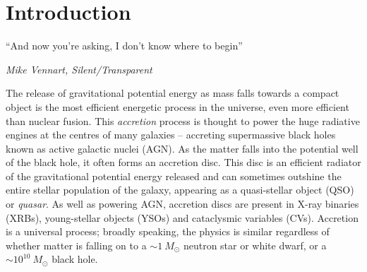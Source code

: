 \chapter{Introduction}

\epigraph{``And now you're asking, I don't know where to begin''}{{\sl Mike Vennart, Silent/Transparent}}
%

The release of gravitational potential energy as mass falls towards
a compact object is the most efficient energetic process in the universe,
even more efficient than nuclear fusion.
This {\em accretion} process is thought to power the huge radiative engines at the 
centres of many galaxies -- accreting supermassive black holes 
known as active galactic nuclei (AGN).
As the matter falls into the potential well of the 
black hole, it often forms an accretion disc.
This disc is an efficient radiator of the gravitational potential energy released
and can sometimes outshine the entire stellar population of the galaxy,
appearing as a quasi-stellar object (QSO) or {\em quasar}. 
As well as powering AGN, accretion discs are present in X-ray binaries (XRBs), 
young-stellar objects (YSOs) and
cataclysmic variables (CVs). Accretion is a universal process; 
broadly speaking, the physics is similar regardless of 
whether matter is falling on to a $\sim1~M_\odot$ neutron star or white dwarf,
or a $\sim10^{10}~M_\odot$ black hole. 

